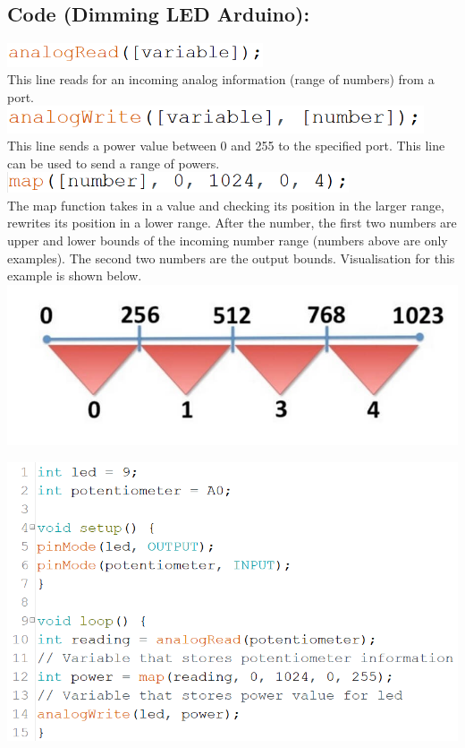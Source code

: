 \documentclass[a4paper,12pt]{report}
\newcommand{\diagramWidth}{150mm}
\newcommand{\codeHeight}{7mm}
\begin{document}
    \newpage
    \subsection*{Code (Dimming LED Arduino):}
        \begin{mdframed}[linewidth = 3, linecolor = turbo_purple]
            \includegraphics[height = \codeHeight]{Assets/aread.png} \\
            This line reads for an incoming analog information (range of numbers) from a port. \\
            \includegraphics[height = 8mm]{Assets/awrite.png} \\ 
            This line sends a power value between 0 and 255 to the specified port. This line can be used to send a range of powers. \\
            \includegraphics[height = 6mm]{Assets/map.png} \\
            The map function takes in a value and checking its position in the larger range, rewrites its position in a lower range. After the number, the first two numbers are upper and lower bounds of the incoming number range (numbers above are only examples). The second two numbers are the output bounds. Visualisation for this example is shown below. \\
            \includegraphics[scale = 0.3]{Assets/map_diagram.jpg}
        \end{mdframed}
        \includegraphics[width = \diagramWidth]{Assets/arduino_pot.png} \\
\end{document}
